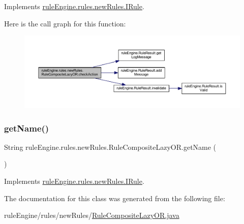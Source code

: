 Implements \mbox{\hyperlink{interfacerule_engine_1_1rules_1_1new_rules_1_1_i_rule_a72ce29a47d7a5fba75a09444a50a481e}{rule\+Engine.\+rules.\+new\+Rules.\+I\+Rule}}.

Here is the call graph for this function\+:
\nopagebreak
\begin{figure}[H]
\begin{center}
\leavevmode
\includegraphics[width=350pt]{classrule_engine_1_1rules_1_1new_rules_1_1_rule_composite_lazy_o_r_a5753ae3a18cd1aab8f34599e47b184b4_cgraph}
\end{center}
\end{figure}
\mbox{\label{classrule_engine_1_1rules_1_1new_rules_1_1_rule_composite_lazy_o_r_a54bdce8894ca26eb101d0332686fecf7}} 
\subsubsection{\texorpdfstring{get\+Name()}{getName()}}
{\footnotesize\ttfamily String rule\+Engine.\+rules.\+new\+Rules.\+Rule\+Composite\+Lazy\+O\+R.\+get\+Name (\begin{DoxyParamCaption}{ }\end{DoxyParamCaption})\hspace{0.3cm}{\ttfamily [inline]}}



Implements \mbox{\hyperlink{interfacerule_engine_1_1rules_1_1new_rules_1_1_i_rule_a99e11d165ca863908c6e985a79917067}{rule\+Engine.\+rules.\+new\+Rules.\+I\+Rule}}.



The documentation for this class was generated from the following file\+:\begin{DoxyCompactItemize}
\item 
rule\+Engine/rules/new\+Rules/\mbox{\hyperlink{_rule_composite_lazy_o_r_8java}{Rule\+Composite\+Lazy\+O\+R.\+java}}\end{DoxyCompactItemize}
